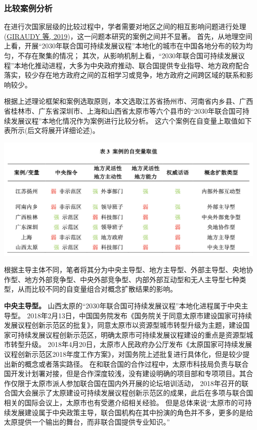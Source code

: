 \documentclass[
  12pt,
]{ctexart}
\begin{document}
\hypertarget{ux6bd4ux8f83ux6848ux4f8bux5206ux6790}{%
\subsubsection{比较案例分析}\label{ux6bd4ux8f83ux6848ux4f8bux5206ux6790}}

在进行次国家层级的比较过程中，学者需要对地区之间的相互影响问题进行处理(\protect\hyperlink{ref-GiraudyEtAl2019d}{GIRAUDY 等, 2019})，这一问题本研究的案例之间并不显著。
首先，从地理空间上看，开展``2030年联合国可持续发展议程''本地化的城市在中国各地分布的较为均匀，不存在聚集的情况；
其次，从影响机制上看，``2030年联合国可持续发展议程''本地化推动进程，大多为中央政府推动、联合国提供专业指导、地方政府配合落实，较少存在地方政府之间的互相学习或竞争，地方政府之间跨区域的联系和影响较少。

根据上述理论框架和案例选取原则，本文选取江苏省扬州市、河南省内乡县、广西省桂林市、广东省深圳市、上海和山西省太原市等六个县市的``2030年联合国可持续发展议程''本地化情况作为案例进行比较分析。
这六个案例在自变量上取值如下表所示(后文将展开详细论述)。

\begin{center}\includegraphics[width=0.9\linewidth]{../figures/table3} \end{center}

根据主导主体不同，笔者将其分为中央主导型、地方主导型、外部主导型、央地协作型、地方外部竞争型、中央外部竞争型、内部外部互动型和无人主导型七种类型，从而比较不同的自变量组合对概念扩散结果的影响。

\textbf{中央主导型。}
山西太原的``2030年联合国可持续发展议程''本地化进程属于中央主导型。
2018年2月13日，中国国务院发布《国务院关于同意太原市建设国家可持续发展议程创新示范区的批复》，同意太原市以资源型城市转型升级为主题，建设国家可持续发展议程创新示范区，明确太原市可持续发展议程建设的重点是资源型城市转型升级。
2018年4月20日，太原市人民政府办公厅发布《太原国家可持续发展议程创新示范区2018年度工作方案》，对国务院上述批复进行具体化，但是较少提出新的概念或者落实路径。
在和联合国的合作过程中，太原市科技局负责与联合国开发计划署对接，但是合作深度较浅，没有建设明确的项目部和专项项目。其合作仅限于太原市派人参加联合国在国内外开展的论坛培训活动，
2018年召开的联合国大会展示了太原建设可持续发展议程创新示范区的成果，此后在多项与联合国相关的国际会议上，太原市也有受邀介绍相关经验。
但是总体来说``太原市的可持续发展建设属于中央政策主导，联合国机构在其中扮演的角色并不多，更多的是给太原提供一个输出的舞台，而非联合国提供专业知识。''
\end{document}
